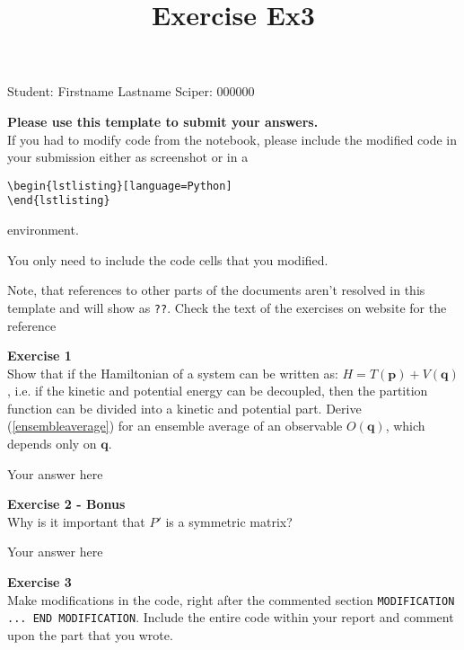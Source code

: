 \documentclass{article}
\title{Exercise Ex3}
\begin{document}
\maketitle\maketitle
\begin{center}\logo\end{center}


Student:  Firstname Lastname    Sciper: 000000

\begin{mdframed}
\textbf{Please use this template to submit your answers.}\\
If you had to modify code from the notebook, please include the modified code in your submission either as screenshot or in a

\begin{verbatim}
\begin{lstlisting}[language=Python]
\end{lstlisting}
\end{verbatim}

environment.

You only need to include the code cells that you modified.

Note, that references to other parts of the documents aren't resolved in this template and will show as \texttt{??}. Check the text of the exercises on website for the reference
\end{mdframed}

\begin{mdframed}
\textbf{Exercise 1}\\
Show that if the Hamiltonian of a system can be written as: $H = T(\mathbf{p}) + V(\mathbf{q})$,
i.e. if the kinetic and potential energy can be decoupled, then the partition function can be divided into a kinetic and potential part. Derive (\ref{ensembleaverage}) for an ensemble average of an observable $O(\mathbf{q})$, which depends only on $\mathbf{q}$.
\end{mdframed}

Your answer here

\begin{mdframed}
\textbf{Exercise 2 - Bonus}\\
Why is it important that $P'$ is a symmetric matrix?
\end{mdframed}

Your answer here

\begin{mdframed}
\textbf{Exercise 3}\\
Make modifications in the code, right after the commented section \texttt{MODIFICATION ... END MODIFICATION}. Include the entire code within your report and comment upon the part that you wrote.
\end{mdframed}
\end{document}
